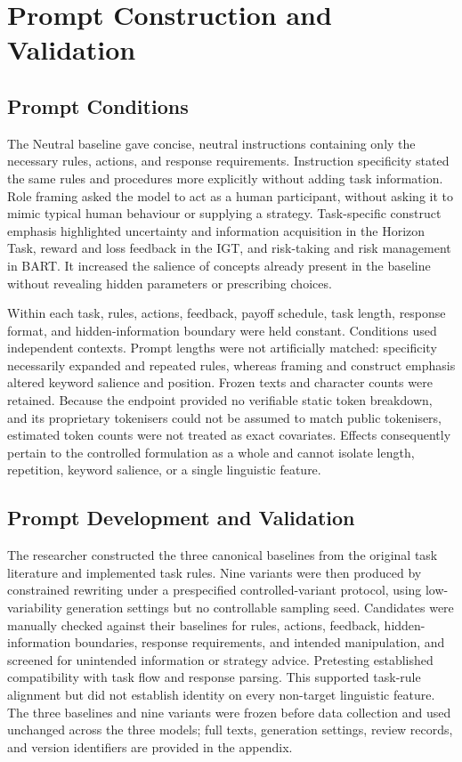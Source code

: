 \documentclass[logo,msc]{infthesis}
\begin{document}
\section{Prompt Construction and Validation}

\subsection{Prompt Conditions}

The Neutral baseline gave concise, neutral instructions containing only the necessary rules, actions, and response requirements. Instruction specificity stated the same rules and procedures more explicitly without adding task information. Role framing asked the model to act as a human participant, without asking it to mimic typical human behaviour or supplying a strategy. Task-specific construct emphasis highlighted uncertainty and information acquisition in the Horizon Task, reward and loss feedback in the IGT, and risk-taking and risk management in BART. It increased the salience of concepts already present in the baseline without revealing hidden parameters or prescribing choices.

Within each task, rules, actions, feedback, payoff schedule, task length, response format, and hidden-information boundary were held constant. Conditions used independent contexts. Prompt lengths were not artificially matched: specificity necessarily expanded and repeated rules, whereas framing and construct emphasis altered keyword salience and position. Frozen texts and character counts were retained. Because the endpoint provided no verifiable static token breakdown, and its proprietary tokenisers could not be assumed to match public tokenisers, estimated token counts were not treated as exact covariates. Effects consequently pertain to the controlled formulation as a whole and cannot isolate length, repetition, keyword salience, or a single linguistic feature.

\subsection{Prompt Development and Validation}

The researcher constructed the three canonical baselines from the original task literature and implemented task rules. Nine variants were then produced by constrained rewriting under a prespecified controlled-variant protocol, using low-variability generation settings but no controllable sampling seed. Candidates were manually checked against their baselines for rules, actions, feedback, hidden-information boundaries, response requirements, and intended manipulation, and screened for unintended information or strategy advice. Pretesting established compatibility with task flow and response parsing. This supported task-rule alignment but did not establish identity on every non-target linguistic feature. The three baselines and nine variants were frozen before data collection and used unchanged across the three models; full texts, generation settings, review records, and version identifiers are provided in the appendix.
\end{document}
